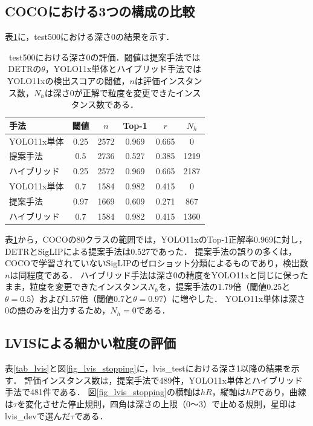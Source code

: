 \subsection{COCOにおける3つの構成の比較}
表\ref{tab_coco}に，test500における深さ0の結果を示す．

\begin{table}[t]
    \centering
    \caption{test500における深さ0の評価．閾値は提案手法ではDETRの$ \theta $，YOLO11x単体とハイブリッド手法ではYOLO11xの検出スコアの閾値，$ n $は評価インスタンス数，$ N_h $は深さ0が正解で粒度を変更できたインスタンス数である．}
    \label{tab_coco}
    \footnotesize
    \setlength{\tabcolsep}{3pt}
    \begin{tabular}{lccccc}
        \toprule
        手法 & 閾値 & $ n $ & Top-1 & $ r $ & $ N_h $ \\
        \midrule
        YOLO11x単体  & 0.25 & 2572 & 0.969 & 0.665 & 0 \\
        提案手法     & 0.5  & 2736 & 0.527 & 0.385 & 1219 \\
        ハイブリッド & 0.25 & 2572 & 0.969 & 0.665 & 2187 \\
        \midrule
        YOLO11x単体  & 0.7  & 1584 & 0.982 & 0.415 & 0 \\
        提案手法     & 0.97 & 1669 & 0.609 & 0.271 & 867 \\
        ハイブリッド & 0.7  & 1584 & 0.982 & 0.415 & 1360 \\
        \bottomrule
    \end{tabular}
\end{table}

表\ref{tab_coco}から，COCOの80クラスの範囲では，YOLO11xのTop-1正解率0.969に対し，DETRとSigLIPによる提案手法は0.527であった．
提案手法の誤りの多くは，COCOで学習されていないSigLIPのゼロショット分類によるものであり，検出数$ n $は同程度である．
ハイブリッド手法は深さ0の精度をYOLO11xと同じに保ったまま，粒度を変更できたインスタンス$ N_h $を，提案手法の1.79倍（閾値0.25と$ \theta = 0.5 $）および1.57倍（閾値0.7と$ \theta = 0.97 $）に増やした．
YOLO11x単体は深さ0の語のみを出力するため，$ N_h = 0 $である．

\subsection{LVISによる細かい粒度の評価}
表\ref{tab_lvis}と図\ref{fig_lvis_stopping}に，lvis\_testにおける深さ1以降の結果を示す．
評価インスタンス数は，提案手法で489件，YOLO11x単体とハイブリッド手法で481件である．
図\ref{fig_lvis_stopping}の横軸は$ hR $，縦軸は$ hP $であり，曲線は$ \tau $を変化させた停止規則，四角は深さの上限（0〜3）で止める規則，星印はlvis\_devで選んだ$ \tau $である．

